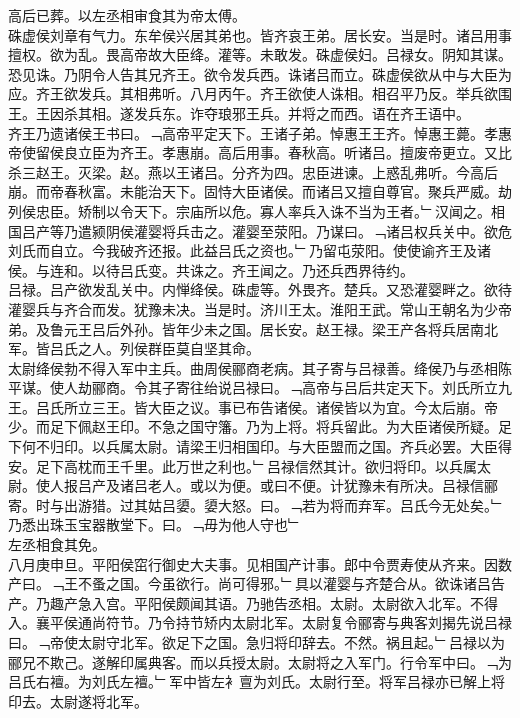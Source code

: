 \documentclass{zhvt-classic}
\begin{document}
\hspace*{2em}高后已葬。以左丞相审食其为帝太傅。\\
\hspace*{2em}硃虚侯刘章有气力。东牟侯兴居其弟也。皆齐哀王弟。居长安。当是时。诸吕用事擅权。欲为乱。畏高帝故大臣绛。灌等。未敢发。硃虚侯妇。吕禄女。阴知其谋。恐见诛。乃阴令人告其兄齐王。欲令发兵西。诛诸吕而立。硃虚侯欲从中与大臣为应。齐王欲发兵。其相弗听。八月丙午。齐王欲使人诛相。相召平乃反。举兵欲围王。王因杀其相。遂发兵东。诈夺琅邪王兵。并将之而西。语在齐王语中。\\
\hspace*{2em}齐王乃遗诸侯王书曰。﹁高帝平定天下。王诸子弟。悼惠王王齐。悼惠王薨。孝惠帝使留侯良立臣为齐王。孝惠崩。高后用事。春秋高。听诸吕。擅废帝更立。又比杀三赵王。灭梁。赵。燕以王诸吕。分齐为四。忠臣进谏。上惑乱弗听。今高后崩。而帝春秋富。未能治天下。固恃大臣诸侯。而诸吕又擅自尊官。聚兵严威。劫列侯忠臣。矫制以令天下。宗庙所以危。寡人率兵入诛不当为王者。﹂汉闻之。相国吕产等乃遣颍阴侯灌婴将兵击之。灌婴至荥阳。乃谋曰。﹁诸吕权兵关中。欲危刘氏而自立。今我破齐还报。此益吕氏之资也。﹂乃留屯荥阳。使使谕齐王及诸侯。与连和。以待吕氏变。共诛之。齐王闻之。乃还兵西界待约。\\
\hspace*{2em}吕禄。吕产欲发乱关中。内惮绛侯。硃虚等。外畏齐。楚兵。又恐灌婴畔之。欲待灌婴兵与齐合而发。犹豫未决。当是时。济川王太。淮阳王武。常山王朝名为少帝弟。及鲁元王吕后外孙。皆年少未之国。居长安。赵王禄。梁王产各将兵居南北军。皆吕氏之人。列侯群臣莫自坚其命。\\
\hspace*{2em}太尉绛侯勃不得入军中主兵。曲周侯郦商老病。其子寄与吕禄善。绛侯乃与丞相陈平谋。使人劫郦商。令其子寄往绐说吕禄曰。﹁高帝与吕后共定天下。刘氏所立九王。吕氏所立三王。皆大臣之议。事已布告诸侯。诸侯皆以为宜。今太后崩。帝少。而足下佩赵王印。不急之国守籓。乃为上将。将兵留此。为大臣诸侯所疑。足下何不归印。以兵属太尉。请梁王归相国印。与大臣盟而之国。齐兵必罢。大臣得安。足下高枕而王千里。此万世之利也。﹂吕禄信然其计。欲归将印。以兵属太尉。使人报吕产及诸吕老人。或以为便。或曰不便。计犹豫未有所决。吕禄信郦寄。时与出游猎。过其姑吕嬃。嬃大怒。曰。﹁若为将而弃军。吕氏今无处矣。﹂乃悉出珠玉宝器散堂下。曰。﹁毋为他人守也﹂\\
\hspace*{2em}左丞相食其免。\\
\hspace*{2em}八月庚申旦。平阳侯窋行御史大夫事。见相国产计事。郎中令贾寿使从齐来。因数产曰。﹁王不蚤之国。今虽欲行。尚可得邪。﹂具以灌婴与齐楚合从。欲诛诸吕告产。乃趣产急入宫。平阳侯颇闻其语。乃驰告丞相。太尉。太尉欲入北军。不得入。襄平侯通尚符节。乃令持节矫内太尉北军。太尉复令郦寄与典客刘揭先说吕禄曰。﹁帝使太尉守北军。欲足下之国。急归将印辞去。不然。祸且起。﹂吕禄以为郦兄不欺己。遂解印属典客。而以兵授太尉。太尉将之入军门。行令军中曰。﹁为吕氏右襢。为刘氏左襢。﹂军中皆左衤亶为刘氏。太尉行至。将军吕禄亦已解上将印去。太尉遂将北军。\\
\end{document}
